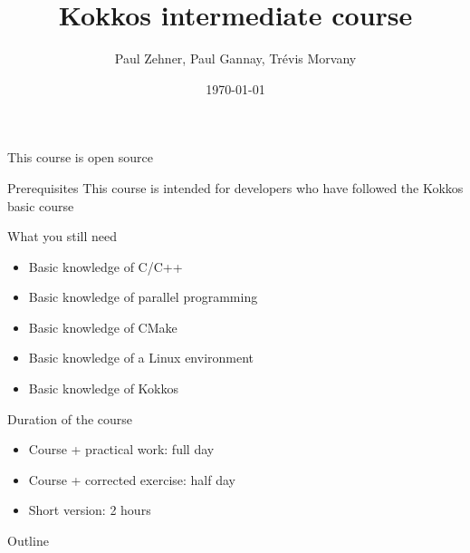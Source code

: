 \documentclass[
    aspectratio=169,
    \createHandout
]{beamer}
\title{Kokkos intermediate course}
\author{\scriptsize Paul Zehner, Paul Gannay, Trévis Morvany}
\institute{CEA}
\date{\today}
\begin{document}
\begin{frame}[plain]
    \titlepage
\end{frame}


\begin{frame}{This course is open source}
    \begin{center}
    \end{center}
\end{frame}


\begin{frame}{Prerequisites}
    This course is intended for developers who have followed the Kokkos basic course

    \vspace{1em}

    \begin{block}{What you still need}
        \begin{itemize}
            \item Basic knowledge of C/C++
            \item Basic knowledge of parallel programming
            \item Basic knowledge of CMake
            \item Basic knowledge of a Linux environment
            \item Basic knowledge of Kokkos
        \end{itemize}
    \end{block}
\end{frame}


\begin{frame}{Duration of the course}
    \begin{itemize}
        \item Course + practical work: full day
        \item Course + corrected exercise: half day
        \item Short version: 2 hours
    \end{itemize}
\end{frame}

\begin{frame}{Outline}
    \tableofcontents[hidesubsections]
\end{frame}
\end{document}
